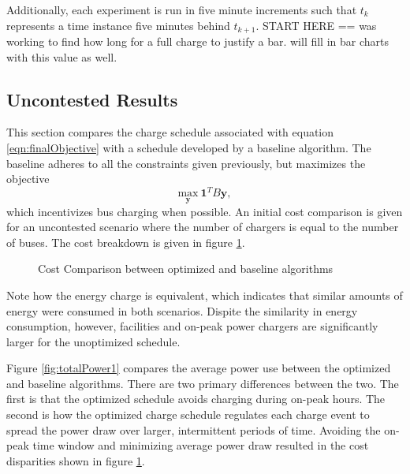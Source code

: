 	\par Additionally, each experiment is run in five minute increments such that $t_k$ represents a time instance five minutes behind $t_{k+1}$.  START HERE == was working to find how long for a full charge to justify a bar. will fill in bar charts with this value as well.

\subsection{Uncontested Results}
This section compares the charge schedule associated with equation \ref{eqn:finalObjective} with a schedule developed by a baseline algorithm.  The baseline adheres to all the constraints given previously, but maximizes the objective 
\begin{equation}
	\underset{\mathbf{y}}{\text{max}} \ \mathbf{1}^TB\mathbf{y},
\end{equation}
which incentivizes bus charging when possible. An initial cost comparison is given for an uncontested scenario where the number of chargers is equal to the number of buses. The cost breakdown is given in figure \ref{fig:costComparison}.
\begin{figure}
	\centering
	\caption{Cost Comparison between optimized and baseline algorithms}
	\label{fig:costComparison}
\end{figure}
\par Note how the energy charge is equivalent, which indicates that similar amounts of energy were consumed in both scenarios. Dispite the similarity in energy consumption, however, facilities and on-peak power chargers are significantly larger for the unoptimized schedule. 
\par Figure \ref{fig:totalPower1} compares the average power use between the optimized and baseline algorithms. There are two primary differences between the two. The first is that the optimized schedule avoids charging during on-peak hours.  The second is how the optimized charge schedule regulates each charge event to spread the power draw over larger, intermittent periods of time. Avoiding the on-peak time window and minimizing average power draw resulted in the cost disparities shown in figure \ref{fig:costComparison}.

